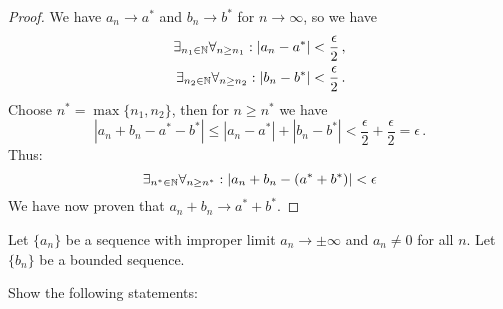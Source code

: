 \documentclass[week=3]{homework}
\begin{document}
\begin{questions}
\begin{parts}
\begin{proof}
	        	We have $a_n \to a^*$ and $b_n \to b^*$ for $n\to\infty$, so we have
		        \begin{align*}
		        	\exists_{n_1 \in\naturals}\forall_{n \geq n_1}: |a_n - a^*| &< \frac{\epsilon}{2}\,, \\
		        	\exists_{n_2 \in\naturals}\forall_{n \geq n_2}: |b_n - b^*| &< \frac{\epsilon}{2}\,.
	        	\end{align*}
	        	Choose $n^* = \max\{n_1,n_2\}$, then for $n \geq n^*$ we have
	        	\[
		        	|a_n + b_n - a^* - b^*| \leq |a_n - a^*| + |b_n - b^*| < \frac{\epsilon}{2} + \frac{\epsilon}{2} = \epsilon\,.
	        	\]
	        	Thus:
	        	\[
		        	\exists_{n^*\in\naturals}\forall_{n\geq n^*}: |a_n + b_n - (a^* + b^*)| < \epsilon
	        	\]
	        	We have now proven that $a_n + b_n \to a^* + b^*$.
	        \end{proof}
        \end{parts}
    
	    \question
	    Let $\{a_n\}$ be a sequence with improper limit $a_n \to \pm\infty$ and $a_n \neq 0$ for all $n$. Let $\{b_n\}$ be a bounded sequence.
	    
	    Show the following statements:
\end{questions}
\end{document}
